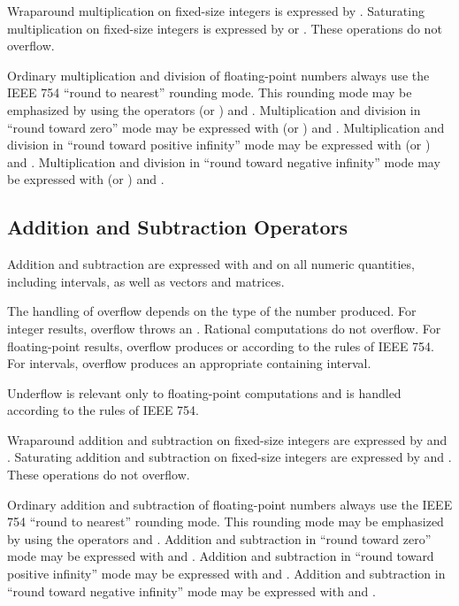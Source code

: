 Wraparound multiplication on fixed-size integers is expressed by
\EXP{\dottimes}.
Saturating multiplication on fixed-size integers is expressed by
\EXP{\boxdot} or \EXP{\boxtimes}.
These operations do not overflow.

Ordinary multiplication and division of floating-point numbers always
use the IEEE 754 ``round to nearest'' rounding mode.  This rounding
mode may be emphasized by using the operators \EXP{\otimes} (or \EXP{\odot})
and \EXP{\oslash}.  Multiplication and division in ``round toward zero''
mode may be expressed with \EXP{\boxtimes} (or \EXP{\boxdot}) and
\EXP{\boxslash}.
Multiplication and division in ``round toward positive infinity''
mode may be expressed with \EXP{\uptimes} (or \EXP{\updot}) and \EXP{\upslash}.
Multiplication and division in ``round toward negative infinity''
mode may be expressed with \EXP{\downtimes} (or \EXP{\downdot}) and
\EXP{\downslash}.

\subsection{Addition and Subtraction Operators}

Addition and subtraction are expressed with \EXP{+} and \EXP{-} on all numeric quantities,
including intervals, as well as vectors and matrices.

The handling of overflow depends on the type of the number produced.
For integer results, overflow throws an .
Rational computations do not overflow.
For floating-point results, overflow produces \EXP{+\infty} or \EXP{-\infty}
according to the rules of IEEE 754.
For intervals, overflow produces an appropriate containing interval.

Underflow is relevant only to floating-point computations and is handled
according to the rules of IEEE 754.

Wraparound addition and subtraction on fixed-size integers are
expressed by \EXP{\dotplus} and \EXP{\dotminus}.
Saturating addition and subtraction on fixed-size integers are
expressed by \EXP{\boxplus} and \EXP{\boxminus}.
These operations do not overflow.

Ordinary addition and subtraction of floating-point numbers always
use the IEEE 754 ``round to nearest'' rounding mode.  This rounding
mode may be emphasized by using the operators \EXP{\oplus}
and \EXP{\ominus}.  Addition and subtraction in ``round toward zero''
mode may be expressed with \EXP{\boxplus} and \EXP{\boxminus}.
Addition and subtraction in ``round toward positive infinity''
mode may be expressed with \EXP{\upplus} and \EXP{\upminus}.
Addition and subtraction in ``round toward negative infinity''
mode may be expressed with \EXP{\downplus} and \EXP{\downminus}.

